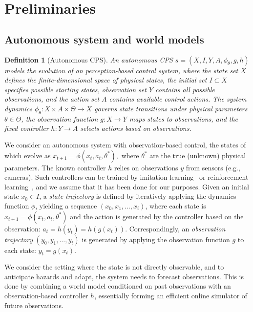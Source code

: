 \documentclass[nonacm,sigconf]{acmart}
\newtheorem{definition}{Definition}
\begin{document}
\section{Preliminaries}\label{sec:preliminaries}

\subsection{Autonomous system and world models}
\begin{definition}[Autonomous CPS]
An \emph{autonomous CPS} $s = (X, I, Y, A, \phi_{\theta}, g, h)$ models the evolution of an perception-based control system, where the state set $X$ defines the finite-dimensional space of physical states, the initial set $I \subset X$ specifies possible starting states, observation set $Y$ contains all possible observations, and the action set $A$ contains available control actions. The system dynamics $\phi_{\theta}: X \times A \times \Theta \rightarrow X$ governs state transitions under physical parameters $\theta \in \Theta$, the observation function $g: X \rightarrow Y$ maps states to observations, and the fixed controller $h: Y \rightarrow A$ selects actions based on observations.
\end{definition}

We consider an autonomous system with observation-based control, the states of which evolve as $x_{t+1} = \phi(x_t, a_t, \theta^*),$ where $\theta^*$ are the true (unknown) physical parameters. The known controller $h$ relies on observations $y$ from sensors (e.g., cameras). Such controllers can be trained by imitation learning~\cite[]{hussein2017imitation} or reinforcement learning~\cite[]{kaelbling1996reinforcement,lillicrap2015continuous}, and we assume that it has been done for our purposes.
Given an initial state \( x_0 \in I \), a \textit{state trajectory} is defined by iteratively applying the dynamics function \( \phi \), yielding a sequence \( (x_0, x_1, \ldots, x_{i}) \), where each state is \( x_{t+1} = \phi(x_t, a_t, \theta^*) \) and the action is generated by the controller based on the observation:  \( a_{t}  = h(y_t) = h(g(x_t)) \). Correspondingly, an \textit{observation trajectory} \( (y_0, y_1, \ldots, y_{t}) \) is generated by applying the observation function \( g \) to each state: \( y_t = g(x_t) \). 


We consider the setting where the state is not directly observable, and to anticipate hazards and adapt, the system needs to forecast observations. This is done by combining a world model conditioned on past observations with an observation-based controller $h$, essentially forming an efficient online simulator of future observations. 
\end{document}
